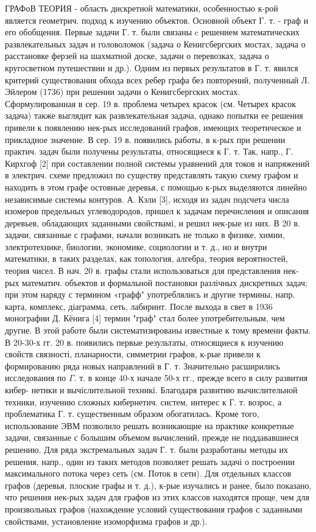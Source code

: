 \documentclass[10pt]{article}
\begin{document}
ГРАФоВ ТЕОРИЯ - область дискретной математики, особенностью к-рой является геометрич. подход к изучению объектов. Основной объект Г. т. - граф и его обобщения. Первые задачи Г. т. были связаны c решением математических развлекательных задач и головоломок (задача о Кенигсбергских мостах, задача о расстановке ферзей на шахматной доске, задачи о перевозках, задача о кругосветном путешествии и др.). Одним из первых результатов в Г. т. явился критерий существования обхода всех ребер графа без повторений, полученный Л. Эйлером (1736) при решении задачи о Кенигсбергских мостах. Сформулированная в сер. 19 в. проблема четырех красок (см. Четырех красок задача) также выглядит как развлекательная задача, однако попытки ее решения привели к появлению нек-рых исследований графов, имеющих теоретическое и прикладное значение. В сер. 19 в. появились работы, в к-рых при решении практич. задач были получены результаты, относящиеся к Г. т. Так, напр., Г. Кирхгоф [2] при составлении полной системы уравнений для токов и напряжений в электрич. схеме предложил по существу представлять такую схему графом и находить в этом графе остовные деревья, с помощью к-рых выделяются линейно независимые системы контуров. А. Кэли [3], исходя из задач подсчета числа изомеров предельных углеводородов, пришел к задачам перечисления и описания деревьев, обладающих заданными свойствамі, и решил нек-рые из них. В 20 в. задачи, связанные с графами, начали возникать не только в физике, химии, электротехнике, биологии, экономике, социологии и т. д., но и внутри математики, в таких разделах, как топология, алгебра, теория вероятностей, теория чисел. В нач. 20 в. графы стали использоваться для представления нек-рых математич. объектов и формальной постановки разлічных дискретных задач; при этом наряду с термином «графф" употреблялись и другие термины, напр. карта, комплекс, діаграмма, сеть, лабиринт. После выхода в свет в 1936 монографии Д. Кёнига [4] термин "граф" стал более употребительным, чем другие. В этой работе были систематизированы известные к тому времени факты. В 20-30-х гг. 20 в. появились первые результаты, относящиеся к изучению свойств связності, планарности, симметрии графов, к-рые привели к формированию ряда новых направлений в Г. т. Значительно расширились исследования по $\Gamma$. т. в конце 40-х начале 50-х гг., прежде всего в силу развития кибер- нетики и вычіслительной техникі. Благодаря развитию вычислительной техники, изучению сложных кибернетич. систем, интерес к Г. т. возрос, а проблематика Г. т. существенным образом обогатилась. Кроме того, использование ЭВМ позволило решать возникающие на практике конкретные задачи, связанные с болышим объемом вычислений, прежде не поддававшиеся решению. Для ряда экстремальных задач Г. т. были разработаны методы их решения, напр., один из таких методов позволяет решать задачі о построении максимального потока через сеть (см. Поток в сети). Для отдельных классов графов (деревья, плоские графы и т. д.), к-рые изучались и ранее, было показано, что решения нек-рых задач для графов из этих классов находятся проще, чем для произвольных графов (нахождение условий существования графов с заданными свойствами, установление изоморфизма графов и др.).
\end{document}
